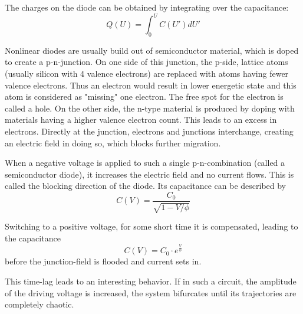 The charges on the diode can be obtained by integrating over the capacitance:
\begin{equation}
 Q \left( U \right) = \int_0^U C \left( U' \right) dU'
\end{equation}

Nonlinear diodes are usually build out of semiconductor material, which is doped to create a p-n-junction. On one side of this junction, the p-side, lattice atoms (usually silicon with 4 valence electrons) are replaced with atoms having fewer valence electrons. Thus an electron would result in lower energetic state and this atom is considered as "missing" one electron. The free spot for the electron is called a hole. On the other side, the n-type material is produced by doping with materials having a higher valence electron count. This leads to an excess in electrons. Directly at the junction, electrons and junctions interchange, creating an electric field in doing so, which blocks further migration.

When a negative voltage is applied to such a single p-n-combination (called a semiconductor diode), it increases the electric field and no current flows. This is called the blocking direction of the diode. Its capacitance can be described by
\begin{equation}
 C \left( V \right) = \frac{C_0}{\sqrt{1-V/\phi}}
\end{equation}

Switching to a positive voltage, for some short time it is compensated, leading to the capacitance
\begin{equation}
 C \left( V \right) = C_0 \cdot e^{\frac{V}{\phi}}
\end{equation}
before the junction-field is flooded and current sets in.

This time-lag leads to an interesting behavior. If in such a circuit, the amplitude of the driving voltage is increased, the system bifurcates until its trajectories are completely chaotic. 


